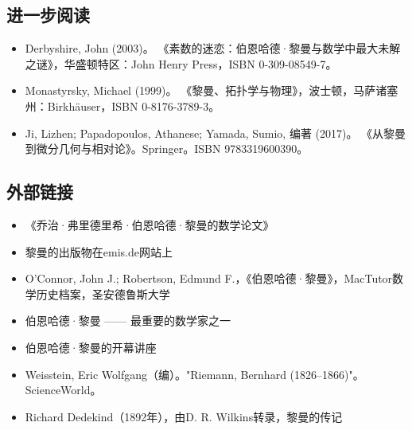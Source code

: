 \subsection{进一步阅读}
\begin{itemize}
\item Derbyshire, John (2003)。 《素数的迷恋：伯恩哈德·黎曼与数学中最大未解之谜》，华盛顿特区：John Henry Press，ISBN 0-309-08549-7。
\item Monastyrsky, Michael (1999)。 《黎曼、拓扑学与物理》，波士顿，马萨诸塞州：Birkhäuser，ISBN 0-8176-3789-3。
\item Ji, Lizhen; Papadopoulos, Athanese; Yamada, Sumio, 编著 (2017)。 《从黎曼到微分几何与相对论》。Springer。ISBN 9783319600390。
\end{itemize}
\subsection{外部链接}
\begin{itemize}
\item 《乔治·弗里德里希·伯恩哈德·黎曼的数学论文》
\item 黎曼的出版物在emis.de网站上
\item O'Connor, John J.; Robertson, Edmund F.，《伯恩哈德·黎曼》，MacTutor数学历史档案，圣安德鲁斯大学
\item 伯恩哈德·黎曼 —— 最重要的数学家之一
\item 伯恩哈德·黎曼的开幕讲座
\item Weisstein, Eric Wolfgang（编）。"Riemann, Bernhard (1826–1866)"。ScienceWorld。
\item Richard Dedekind（1892年），由D. R. Wilkins转录，黎曼的传记
\end{itemize}